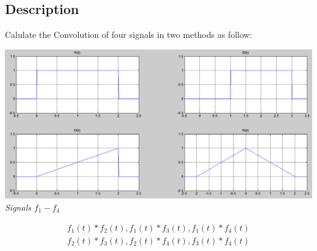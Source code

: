 \documentclass[UTF8,a4paper]{article}
\begin{document}
\subsection{Description}
Calulate the Convolution of four signals in two methods as follow:
\begin{center}
    \includegraphics[scale=0.6]{T-2.png}
	\textit{Signals $f_1-f_4$}
\end{center}
$$
\begin{aligned}
f_1(t)*f_2(t),f_1(t)*f_3(t),f_1(t)*f_4(t)\\
f_2(t)*f_3(t),f_2(t)*f_4(t),f_3(t)*f_4(t)\\
\end{aligned}
$$
\end{document}
